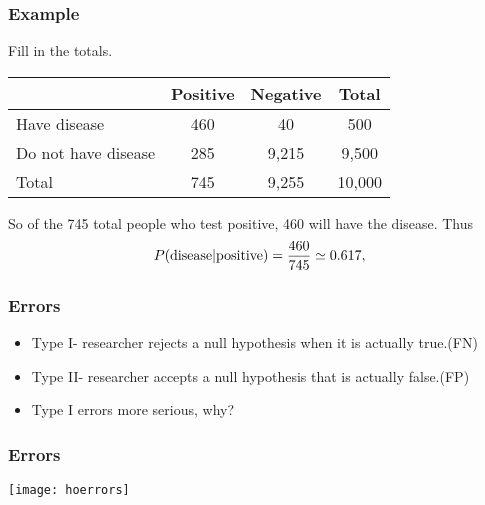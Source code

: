 \begin{frame}
\frametitle{Example}

\vspace{.1in}
Fill in the totals.\\ 
\begin{center}
\begin{tabular}{|l|c|c|c|}
\hline
& Positive & Negative &Total\\
\hline
Have disease &460 &40&500\\
\hline
Do not have disease &285& 9,215&9,500\\
\hline
Total &745&9,255&10,000\\
\hline
\end{tabular}
\end{center}

So of the 745 total people who test positive, 460 will have the disease.  Thus 
\begin{equation*}
P(\hbox{disease}|\hbox{positive})=\frac{460}{745} \simeq 0.617,
\end{equation*}
\end{frame}


\begin{frame}[fragile]\frametitle{Errors}
\begin{itemize}
\item Type I- researcher rejects a null hypothesis when it is actually true.(FN)
\item Type II- researcher accepts a null hypothesis that is actually false.(FP)
\item Type I errors more serious, why?
\end{itemize}
\end{frame}


\begin{frame}[fragile]\frametitle{Errors}
\begin{center}
\texttt{[image: hoerrors]}
\end{center}
\end{frame}

